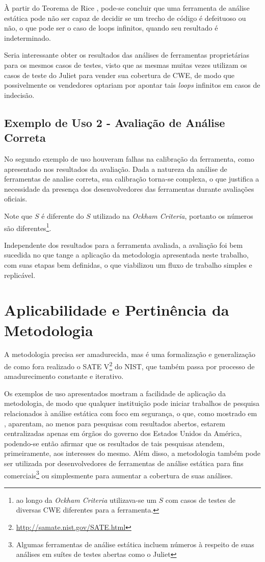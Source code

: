 À partir do Teorema de Rice \cite{rice}, pode-se concluir que uma ferramenta de análise estática pode não ser capaz de decidir se um trecho de código é defeituoso ou não, o que pode ser o caso de loops infinitos, quando seu resultado é indeterminado.

Seria interessante obter os resultados das análises de ferramentas proprietárias para os mesmos casos de testes, visto que as mesmas muitas vezes utilizam os casos de teste do Juliet para vender sua cobertura de CWE, de modo que possivelmente os vendedores optariam por apontar tais \textit{loops} infinitos em casos de indecisão.

\subsection*{Exemplo de Uso 2 - Avaliação de Análise Correta}

No segundo exemplo de uso houveram falhas na calibração da ferramenta, como apresentado nos resultados da avaliação. Dada a natureza da análise de ferramentas de analise correta, sua calibração torna-se complexa, o que justifica a necessidade da presença dos desenvolvedores das ferramentas durante avaliações oficiais.

Note que $S$ é diferente do $S$ utilizado na \textit{Ockham Criteria}, portanto os números são diferentes\footnote{ao longo da \textit{Ockham Criteria} utilizava-se um $S$ com casos de testes de diversas CWE diferentes para a ferramenta.}.

Independente dos resultados para a ferramenta avaliada, a avaliação foi bem sucedida no que tange a aplicação da metodologia apresentada neste trabalho, com suas etapas bem definidas, o que viabilizou um fluxo de trabalho simples e replicável. 

\section*{Aplicabilidade e Pertinência da Metodologia}

A metodologia precisa ser amadurecida, mas é uma formalização e generalização de como fora realizado o SATE V\footnote{\url{http://samate.nist.gov/SATE.html}} do NIST, que também passa por processo de amadurecimento constante e iterativo.

Os exemplos de uso apresentados mostram a facilidade de aplicação da metodologia, de modo que qualquer instituição pode iniciar trabalhos de pesquisa relacionados à análise estática com foco em segurança, o que, como mostrado em , aparentam, ao menos para pesquisas com resultados abertos, estarem centralizadas apenas em órgãos do governo dos Estados Unidos da América, podendo-se então afirmar que os resultados de tais pesquisas atendem, primeiramente, aos interesses do mesmo. Além disso, a metodologia também pode ser utilizada por desenvolvedores de ferramentas de análise estática para fins comerciais\footnote{Algumas ferramentas de análise estática incluem números à respeito de suas análises em suítes de testes abertas como o Juliet} ou simplesmente para aumentar a cobertura de suas análises.

